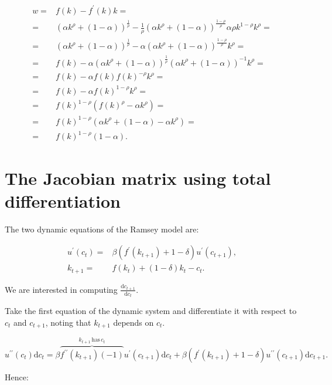 \documentclass[11pt,a4paper,english]{article}
\begin{document}
\begin{align*}
    w =& f(k) - f^\prime(k) k = \\
    =&\left( \alpha k^\rho + (1-\alpha)\right)^\frac{1}{\rho}  - \frac{1}{\rho}\left( \alpha k^\rho + (1-\alpha)\right)^\frac{1-\rho}{\rho}\alpha \rho k^{1-\rho} k^\rho = \\
    =&\left( \alpha k^\rho + (1-\alpha)\right)^\frac{1}{\rho}  - \alpha\left( \alpha k^\rho + (1-\alpha)\right)^\frac{1-\rho}{\rho}k^\rho = \\
    =& f(k) - \alpha\left( \alpha k^\rho + (1-\alpha)\right)^\frac{1}{\rho}\left( \alpha k^\rho + (1-\alpha)\right)^{-1} k^\rho = \\
    =& f(k) - \alpha f(k)f(k)^{-\rho}k^\rho = \\
    =& f(k) - \alpha f(k)^{1-\rho}k^\rho = \\
    =& f(k)^{1-\rho}\left(f(k)^\rho - \alpha k^\rho\right) = \\
    =& f(k)^{1-\rho}\left(\alpha k^\rho + (1-\alpha) - \alpha k^\rho\right) = \\
    =& f(k)^{1-\rho}(1-\alpha).
\end{align*}


\section{The Jacobian matrix using total differentiation}

The two dynamic equations of the Ramsey model are:

\begin{align*}
    u^\prime(c_{t}) =& \beta(f^\prime(k_{t+1}) + 1 - \delta) u^\prime(c_{t+1}),\\
    k_{t+1} =& f(k_{t}) + (1-\delta)k_{t} - c_{t}.
\end{align*}

We are interested in computing $\frac{\mathrm{d} c_{t+1}}{\mathrm{d} c_t}.$

Take the first equation of the dynamic system and differentiate it with respect to $c_t$ and $c_{t+1}$, noting that $k_{t+1}$ depends on $c_{t}.$

\begin{equation*}
    u^{\prime \prime}(c_t)\mathrm{d}c_t = \beta \overbrace{f^{\prime \prime}(k_{t+1})(-1)}^{k_{t+1}\, \mathrm{has}\, c_t}u^\prime(c_{t+1})\mathrm{d}c_t + \beta(f^\prime(k_{t+1}) + 1 - \delta)u^{\prime \prime}(c_{t+1})\mathrm{d}c_{t+1}.
\end{equation*}

Hence:
\end{document}
